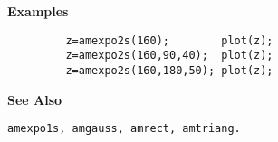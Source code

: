 {\bf \large \sf Examples}
\begin{verbatim}
         z=amexpo2s(160);        plot(z);
         z=amexpo2s(160,90,40);  plot(z);
         z=amexpo2s(160,180,50); plot(z);
\end{verbatim}
\vspace*{.5cm}


{\bf \large \sf See Also}\\
\hspace*{1.5cm}
\begin{minipage}[t]{13.5cm}
\begin{verbatim}
amexpo1s, amgauss, amrect, amtriang.
\end{verbatim}
\end{minipage}


